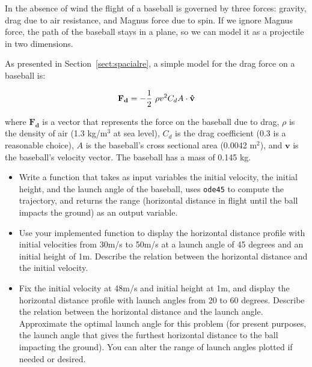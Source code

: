 \documentclass[
]{book}
\numberwithin{Answer}{chapter}
\numberwithin{Exercise}{chapter}
\renewcommand{\vec}[1]{\bm{\mathbf{#1}}}
\newcommand{\uveci}{{\bm{\hat{\textnormal{\bfseries\i}}}}}
\newcommand{\uvecj}{{\bm{\hat{\textnormal{\bfseries\j}}}}}
\newcommand{\uvec}[1]{%
    \ifthenelse{\equal{#1}{i}}%
        {\uveci}{%
    \ifthenelse{\equal{#1}{j}}%
        {\uvecj}{%
    {\bm{\hat{\mathbf{#1}}}}%
}}}
\begin{document}
\begin{ex}
\label{ex:baseball}

In the absence of wind the flight of a baseball is governed by three forces: gravity,
drag due to air resistance, and Magnus force due to spin.  If
we ignore Magnus force, the path of the baseball stays
in a plane, so we can model it as a projectile in two
dimensions.

As presented in Section~\ref{sect:spacialre}, a simple model for the drag force
    on a baseball is:

\begin{equation}
    \vec{F_d} = - \frac{1}{2} ~ \rho v^2 C_d A \cdot \uvec{v}
\end{equation}

where $\vec{F_d}$ is a vector that represents the force on the baseball
    due to drag, $\rho$ is the density of air (1.3 kg/m$^3$ at sea
    level), $C_d$ is the drag coefficient (0.3 is a reasonable choice),
     $A$ is the baseball's cross sectional area (0.0042 m$^2$), and
    $\vec{v}$ is the baseball's velocity vector.  The baseball has a mass of
    0.145 kg.

\begin{itemize}

\item Write a function that takes
as input variables
the initial velocity, the initial height, and the launch angle of the baseball,
uses {\tt ode45} to compute
the trajectory, and returns the range (horizontal distance in flight until
the ball impacts the ground)
as an output variable.

\item Use your implemented function to display the horizontal distance profile
with initial velocities from 30m/s to 50m/s at a launch angle of 45 degrees
and an initial height of 1m.
Describe the relation between the horizontal distance and the initial velocity.

\item Fix the initial velocity at 48m/s and initial height at 1m, and display
the horizontal distance profile
with launch angles from 20 to 60 degrees. Describe the relation between
the horizontal distance and the launch angle.  Approximate the optimal
launch angle for this problem (for present purposes, the launch angle that gives the furthest horizontal distance to the ball impacting the ground).
You can alter the range of launch angles plotted if needed or desired.

\end{itemize}

\end{ex}
\end{document}
